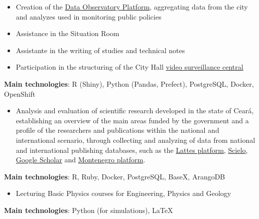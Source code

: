 \documentclass[10pt,a4paper,ragged2e,withhyper]{altacv}
\begin{document}
\begin{paracol}{2}


\begin{itemize}
\item Creation of the \href{https://observatoriodefortaleza.fortaleza.ce.gov.br/dados/}{Data Observatory Platform}, aggregating data from the city and analyzes used in monitoring public policies
\item Assistance in the Situation Room
\item Assistante in the writing of studies and technical notes
\item Participation in the structuring of the City Hall \href{https://www.fortaleza.ce.gov.br/noticias/fortaleza-cidade-inteligente-prefeitura-anuncia-central-integrada-e-politica-publica-de-videomonitoramento}{video surveillance central}
\end{itemize}

\textbf{Main technologies}: R (Shiny), Python (Pandas, Prefect), PostgreSQL, Docker, OpenShift

\divider


\begin{itemize}
\item Analysis and evaluation of scientific research developed in the state of Ceará, establishing an overview of the main areas funded by the government and a profile of the researchers and publications within the national and international scenario, through collecting and analyzing of data from national and international publishing databases, such as the \href{https://lattes.cnpq.br/}{Lattes platform}, \href{https://www.scielo.br}{Scielo}, \href{https://scholar.google.com.br/}{Google Scholar} and \href{http://montenegro.funcap.ce.gov.br/sugba/}{Montenegro platform}.
\end{itemize}
\textbf{Main technologies}: R, Ruby, Docker, PostgreSQL, BaseX, ArangoDB

\divider


\begin{itemize}
\item Lecturing Basic Physics courses for Engineering, Physics and Geology
\end{itemize}
\textbf{Main technologies}: Python (for simulations), LaTeX


\end{paracol}
\end{document}
